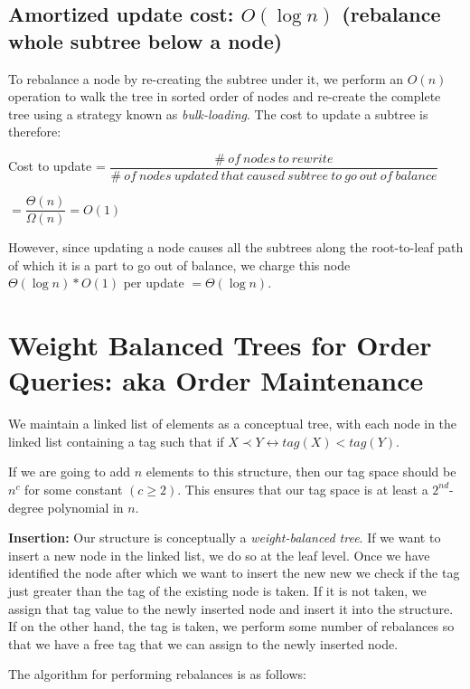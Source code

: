 \documentclass{article}
\begin{document}
\subsection{Amortized update cost: $O(\log{n})$ (rebalance whole subtree below a node)}

To rebalance a node by re-creating the subtree under it, we perform an
$O(n)$ operation to walk the tree in sorted order of nodes and
re-create the complete tree using a strategy known as
\textit{bulk-loading}. The cost to update a subtree is therefore:

Cost to update =
$\dfrac{\#\ of\ nodes\ to\ rewrite}{\#\ of\ nodes\ updated\ that\ caused\ subtree\ to\ go\ out\ of\ balance}$

$=\dfrac{\Theta(n)}{\Omega(n)} = O(1)$

However, since updating a node causes all the subtrees along the
root-to-leaf path of which it is a part to go out of balance, we
charge this node $\Theta(\log{n}) * O(1)$ per update
$=\Theta(\log{n})$.

\clearpage

\section{Weight Balanced Trees for Order Queries: aka Order
  Maintenance}

We maintain a linked list of elements as a conceptual tree, with each
node in the linked list containing a tag such that if $X \prec Y
\leftrightarrow tag(X) < tag(Y)$.

If we are going to add $n$ elements to this structure, then our tag
space should be $n^c$ for some constant $(c \ge 2)$. This ensures that
our tag space is at least a $2^{nd}$-degree polynomial in $n$.

\textbf{Insertion:} Our structure is conceptually a
\textit{weight-balanced tree}. If we want to insert a new node in the
linked list, we do so at the leaf level. Once we have identified the
node after which we want to insert the new new we check if the tag
just greater than the tag of the existing node is taken. If it is not
taken, we assign that tag value to the newly inserted node and insert
it into the structure. If on the other hand, the tag is taken, we
perform some number of rebalances so that we have a free tag that we
can assign to the newly inserted node.

The algorithm for performing rebalances is as follows:
\end{document}
